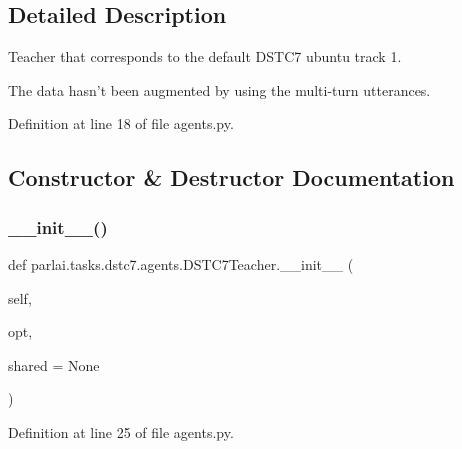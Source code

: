 \subsection{Detailed Description}
\begin{DoxyVerb}Teacher that corresponds to the default DSTC7 ubuntu track 1.

The data hasn't been augmented by using the multi-turn utterances.
\end{DoxyVerb}
 

Definition at line 18 of file agents.\+py.



\subsection{Constructor \& Destructor Documentation}
\mbox{\label{classparlai_1_1tasks_1_1dstc7_1_1agents_1_1DSTC7Teacher_a5773b0073045b31e9308070e271e8b15}} 
\subsubsection{\texorpdfstring{\+\_\+\+\_\+init\+\_\+\+\_\+()}{\_\_init\_\_()}}
{\footnotesize\ttfamily def parlai.\+tasks.\+dstc7.\+agents.\+D\+S\+T\+C7\+Teacher.\+\_\+\+\_\+init\+\_\+\+\_\+ (\begin{DoxyParamCaption}\item[{}]{self,  }\item[{}]{opt,  }\item[{}]{shared = {\ttfamily None} }\end{DoxyParamCaption})}



Definition at line 25 of file agents.\+py.


